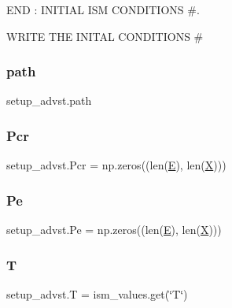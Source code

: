 E\+ND \+: I\+N\+I\+T\+I\+AL I\+SM C\+O\+N\+D\+I\+T\+I\+O\+NS \#. 

W\+R\+I\+TE T\+HE I\+N\+I\+T\+AL C\+O\+N\+D\+I\+T\+I\+O\+NS \# \mbox{\label{namespacesetup__advst_afcf8bfc1996ec2ad8d8472657a384e88}} 
\subsubsection{\texorpdfstring{path}{path}}
{\footnotesize\ttfamily setup\+\_\+advst.\+path}

\mbox{\label{namespacesetup__advst_a8644074ca2fbad195ca981d15c8a711d}} 
\subsubsection{\texorpdfstring{Pcr}{Pcr}}
{\footnotesize\ttfamily setup\+\_\+advst.\+Pcr = np.\+zeros((len(\hyperlink{namespacesetup__advst_a846b33b3abeae0f60876a6d51bb0ae79}{E}), len(\hyperlink{namespacesetup__advst_a4fe22219bfc7363b6decb33a0885e17a}{X})))}

\mbox{\label{namespacesetup__advst_a25edc171dc71b8c313e1766015540dd1}} 
\subsubsection{\texorpdfstring{Pe}{Pe}}
{\footnotesize\ttfamily setup\+\_\+advst.\+Pe = np.\+zeros((len(\hyperlink{namespacesetup__advst_a846b33b3abeae0f60876a6d51bb0ae79}{E}), len(\hyperlink{namespacesetup__advst_a4fe22219bfc7363b6decb33a0885e17a}{X})))}

\mbox{\label{namespacesetup__advst_a85a50049bddefa706df2cb55f9e9ea07}} 
\subsubsection{\texorpdfstring{T}{T}}
{\footnotesize\ttfamily setup\+\_\+advst.\+T = ism\+\_\+values.\+get(\char`\"{}T\char`\"{})}

